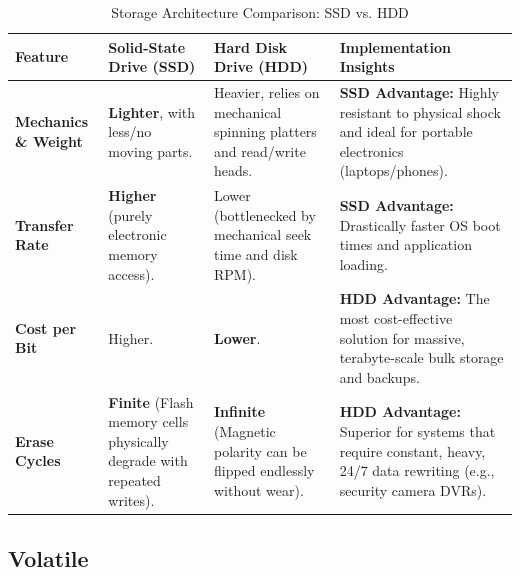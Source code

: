 \documentclass[10pt]{article}
\begin{document}
\begin{table}[H]
    \centering
    \footnotesize 
    \renewcommand{\arraystretch}{1.2} 
    \begin{tabular}{@{} l p{3.5cm} p{3.5cm} p{4.5cm} @{}}
        \toprule
        \textbf{Feature} & \textbf{Solid-State Drive (SSD)} & \textbf{Hard Disk Drive (HDD)} & \textbf{Implementation Insights} \\
        \midrule
        \textbf{Mechanics \& Weight} & 
        \textbf{Lighter}, with less/no moving parts. & 
        Heavier, relies on mechanical spinning platters and read/write heads. & 
        \textbf{SSD Advantage:} Highly resistant to physical shock and ideal for portable electronics (laptops/phones). \\
        
        \textbf{Transfer Rate} & 
        \textbf{Higher} (purely electronic memory access). & 
        Lower (bottlenecked by mechanical seek time and disk RPM). & 
        \textbf{SSD Advantage:} Drastically faster OS boot times and application loading. \\
        
        \textbf{Cost per Bit} & 
        Higher. & 
        \textbf{Lower}. & 
        \textbf{HDD Advantage:} The most cost-effective solution for massive, terabyte-scale bulk storage and backups. \\
        
        \textbf{Erase Cycles} & 
        \textbf{Finite} (Flash memory cells physically degrade with repeated writes). & 
        \textbf{Infinite} (Magnetic polarity can be flipped endlessly without wear). & 
        \textbf{HDD Advantage:} Superior for systems that require constant, heavy, 24/7 data rewriting (e.g., security camera DVRs). \\
        \bottomrule
    \end{tabular}
    \caption{Storage Architecture Comparison: SSD vs. HDD}
\end{table}



\subsection*{Volatile}
\end{document}
